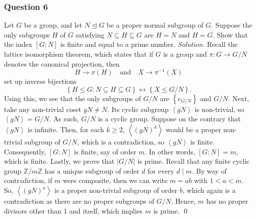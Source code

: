 \documentclass[12pt]{article}
\begin{document}
\subsubsection*{Question 6}
Let $G$ be a group, and let $N\unlhd  G$ be a proper normal subgroup of $G$. Suppose the only subgroups $H$ of $G$ satisfying $N\subseteq H\subseteq G$ are $H=N$ and $H=G$. Show that the index $[G:N]$ is finite and equal to a prime number.
\newline
\newline\textit{Solution.} Recall the lattice isomorphism theorem, which states that if $G$ is a group and $\pi:G\to G/N$ denotes the canonical projection, then \[H\to \pi\left(H\right)\quad\text{and}\quad X\to \pi^{-1}\left(X\right)\]
set up inverse bijections \[\left\{H\le G:N\subseteq H\subseteq G\right\}\leftrightarrow\left\{X\le G/N\right\}.\]
Using this, we see that the only subgroups of $G/N$ are $\left\{e_{G/N}\right\}$ and $G/N$. Next, take any non-trivial coset $gN\ne N$. Its cyclic subgroup $\left\langle gN\right\rangle$ is non-trivial, so $\left\langle gN\right\rangle = G/N$. As such, $G/N$ is a cyclic group.
\newline
\newline Suppose on the contrary that $\left\langle gN\right\rangle$ is infinite. Then, for each $k\ge 2$, $\left\langle\left(gN\right)^k\right\rangle$ would be a proper non-trivial subgroup of $G/N$, which is a contradiction, so $\left\langle gN\right\rangle$ is finite. Consequently, $\left[G:N\right]$ is finite, say of order $m$. In other words, $\left[G:N\right]=m$, which is finite.
\newline
\newline Lastly, we prove that $\left|G/N\right|$ is prime. Recall that any finite cyclic group $\mathbb{Z}/m\mathbb{Z}$ has a unique subgroup of order $d$ for every $d\mid m$. By way of contradiction, if $m$ were composite, then we can write $m=ab$ with $1<a<m$. So, $\left\langle \left(gN\right)^a\right\rangle$ is a proper non-trivial subgroup of order $b$, which again is a contradiction as there are no proper subgroups of $G/N$. Hence, $m$ has no proper divisors other than 1 and itself, which implies $m$ is prime. \qed 
\end{document}
